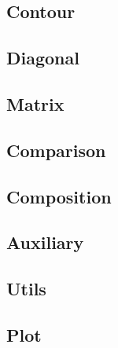 \documentclass[10pt]{article}
\newcommand{\code}[2]{
 \hrulefill
  \subsection*{#1}
  
  \vspace{2em}
}
\begin{document}
\code{Contour}{../contour/contour.py}
\code{Diagonal}{../contour/diagonal.py}
\code{Matrix}{../contour/matrix.py}
\code{Comparison}{../contour/comparison.py}
\code{Composition}{../contour/composition.py}
\code{Auxiliary}{../contour/auxiliary.py}
\code{Utils}{../contour/utils.py}
\code{Plot}{../contour/plot.py}
\end{document}
